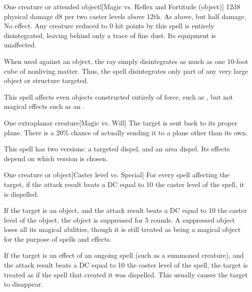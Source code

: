 \spellrng{\rngclose}
\begin{spelltarget}{One creature or attended object}l[Magic vs. Reflex and Fortitude (object)]
    \spellsuccess 12d8 physical damage \add d8 per two caster levels above 12th.
    \spellfailure[Fortitude] As above, but half damage.
    \spellfailure[Reflex] No effect.
    \spelleffect Any creature reduced to 0 hit points by this spell is entirely disintegrated, leaving behind only a trace of fine dust. Its equipment is unaffected.
    \par When used against an object, the ray simply disintegrates as much as one 10-foot cube of nonliving matter. Thus, the spell disintegrates only part of any very large object or structure targeted.
\end{spelltarget}
\spellnotes This spell affects even objects constructed entirely of force, such as , but not magical effects such as an .

\spellrng{\rngclose}
\begin{spelltarget}{One extraplanar creature}[Magic vs. Will]
    \spellsuccess The target is sent back to its proper plane. There is a 20\% chance of actually sending it to a plane other than its own.
\end{spelltarget}

\spellrng{\rngmed}
\spellspecial This spell has two versions: a targeted dispel, and an area dispel. Its effects depend on which version is chosen.
\begin{spelltarget}{One creature or object}[Caster level vs. Special]
    \spelleffect For every spell affecting the target, if the attack result beats a DC equal to 10 \add the caster level of the spell, it is dispelled.

    If the target is an object, and the attack result beats a DC equal to 10 \add the caster level of the object, the object is suppressed for 5 rounds. A suppressed object loses all its magical abilities, though it is still treated as being a magical object for the purpose of spells and effects.

    If the target is an effect of an ongoing spell (such as a summoned creature), and the attack result beats a DC equal to 10 \add the caster level of the spell, the target is treated as if the spell that created it was dispelled. This usually causes the target to disappear.
\end{spelltarget}

